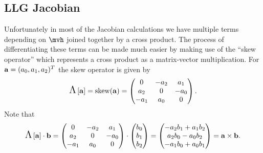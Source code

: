 \subsection{LLG Jacobian}
\label{sec:llg-jacobian}

Unfortunately in most of the Jacobian calculations we have multiple terms depending on $\mvh$ joined together by a cross product.
The process of differentiating these terms can be made much easier by making use of the ``skew operator'' which represents a cross product as a matrix-vector multiplication.
For ${\boldsymbol{\mathrm{a}}} = (a_0, a_1, a_2)^T$ the skew operator is given by
\begin{equation}
  \text{\Large{$\Lambda$}}\left[ {\boldsymbol{\mathrm{a}}} \right] = \text{skew}({\boldsymbol{\mathrm{a}}}) =
  \begin{pmatrix}
    0 & -a_2 & a_1 \\
    a_2 & 0 & -a_0 \\
    -a_1 & a_0 & 0
  \end{pmatrix}.
  \label{eqn:skew}
\end{equation}
Note that
\begin{equation}
  \text{\Large{$\Lambda$}}\left[ {\boldsymbol{\mathrm{a}}} \right] \cdot {\boldsymbol{\mathrm{b}}}
  = \begin{pmatrix}
    0 & -a_2 & a_1 \\
    a_2 & 0 & -a_0 \\
    -a_1 & a_0 & 0
  \end{pmatrix}
  \cdot \begin{pmatrix} b_0 \\ b_1 \\ b_2 \end{pmatrix}
  = \begin{pmatrix} -a_2b_1 + a_1b_2 \\ a_2b_0 - a_0b_2 \\ -a_1b_0 + a_0b_1 \end{pmatrix}
  = {\boldsymbol{\mathrm{a}}} \times {\boldsymbol{\mathrm{b}}}.
\end{equation}

